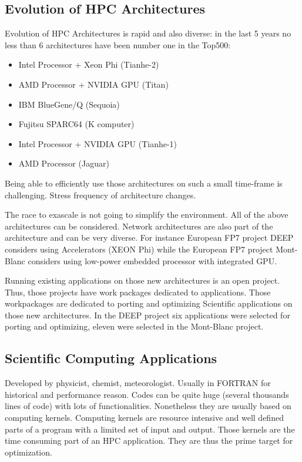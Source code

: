 \documentclass[review]{elsarticle}
\begin{document}
  \subsection{Evolution of HPC Architectures}

Evolution of HPC Architectures is rapid and also diverse: in the last 5
years no less than 6 architectures have been number one in the Top500:
\begin{itemize}
\item Intel Processor + Xeon Phi (Tianhe-2)
\item AMD Processor + NVIDIA GPU (Titan)
\item IBM BlueGene/Q (Sequoia)
\item Fujitsu SPARC64 (K computer)
\item Intel Processor + NVIDIA GPU (Tianhe-1)
\item AMD Processor (Jaguar)
\end{itemize}
Being able to efficiently use those architectures on such a small
time-frame is challenging. Stress frequency of architecture changes.

The race to exascale is not going to simplify the environment. All of the above
architectures can be considered. Network architectures are also part of the
architecture and can be very diverse.  For instance European FP7 project DEEP
considers using Accelerators (XEON Phi) while the European FP7 project
Mont-Blanc considers using low-power embedded processor with integrated GPU.

Running existing applications on those new architectures is an open project.
Thus, those projects have work packages dedicated to applications. Those
workpackages are dedicated to porting and optimizing Scientific applications on
those new architectures. In the DEEP project six applications were selected for
porting and optimizing, eleven were selected in the Mont-Blanc project.
 
  \subsection{Scientific Computing Applications}

Developed by physicist, chemist, meteorologist. Usually in FORTRAN for
historical and performance reason. Codes can be quite huge (several
thousands lines of code) with lots of functionalities. Nonetheless they are
usually based on computing kernels. Computing kernels are resource
intensive and well defined parts of a program with a limited set of input
and output. Those kernels are the time consuming part of an HPC
application. They are thus the prime target for optimization.
\end{document}
